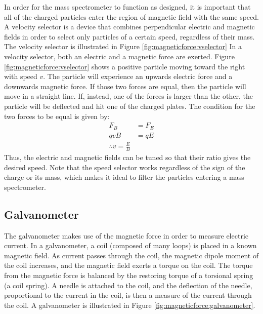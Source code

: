 In order for the mass spectrometer to function as designed, it is important that all of the charged particles enter the region of magnetic field with the same speed. A velocity selector is a device that combines perpendicular electric and magnetic fields in order to select only particles of a certain speed, regardless of their mass. The velocity selector is illustrated in Figure \ref{fig:magneticforce:vselector}
In a velocity selector, both an electric and a magnetic force are exerted. Figure \ref{fig:magneticforce:vselector} shows a positive particle moving toward the right with speed $v$. The particle will experience an upwards electric force and a downwards magnetic force. If those two forces are equal, then the particle will move in a straight line. If, instead, one of the forces is larger than the other, the particle will be deflected and hit one of the charged plates. The condition for the two forces to be equal is given by:
\begin{align*}
F_B &= F_E\\
qvB &= qE\\
\therefore v=\frac{E}{B}
\end{align*}
Thus, the electric and magnetic fields can be tuned so that their ratio gives the desired speed. Note that the speed selector works regardless of the sign of the charge or its mass, which makes it ideal to filter the particles entering a mass spectrometer.
\subsection{Galvanometer}
The galvanometer makes use of the magnetic force in order to measure electric current. In a galvanometer, a coil (composed of many loops) is placed in a known magnetic field. As current passes through the coil, the magnetic dipole moment of the coil increases, and the magnetic field exerts a torque on the coil. The torque from the magnetic force is balanced by the restoring torque of a torsional spring (a coil spring). A needle is attached to the coil, and the deflection of the needle, proportional to the current in the coil, is then a measure of the current through the coil. A galvanometer is illustrated in Figure \ref{fig:magneticforce:galvanometer}.

